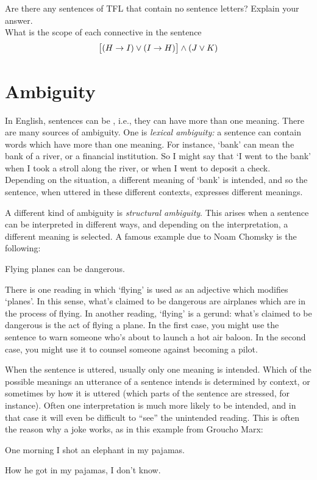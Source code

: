 \problempart
Are there any sentences of TFL that contain no sentence letters? Explain your answer.\\

\problempart
What is the scope of each connective in the sentence
$$\bigl[(H \rightarrow I) \vee (I \rightarrow H)\bigr] \wedge (J \vee K)$$

\chapter{Ambiguity}\label{s:AmbiguityTFL}

In English, sentences can be , i.e., they can have more than one meaning.  There are many sources of ambiguity. One is \emph{lexical ambiguity:} a sentence can contain words which have more than one meaning.  For instance, `bank' can mean the bank of a river, or a financial institution. So I might say that `I went to the bank' when I took a stroll along the river, or when I went to deposit a check.  Depending on the situation, a different meaning of `bank' is intended, and so the sentence, when uttered in these different contexts, expresses different meanings.

A different kind of ambiguity is \emph{structural ambiguity}.  This arises when a sentence can be interpreted in different ways, and depending on the interpretation, a different meaning is selected.  A famous example due to Noam Chomsky is the following:
\begin{compactlist}
	\item[] Flying planes can be dangerous.
\end{compactlist}
There is one reading in which `flying' is used as an adjective which modifies `planes'. In this sense, what's claimed to be dangerous are airplanes which are in the process of flying.  In another reading, `flying' is a gerund: what's claimed to be dangerous is the act of flying a plane.  In the first case, you might use the sentence to warn someone who's about to launch a hot air baloon.  In the second case, you might use it to counsel someone against becoming a pilot.

When the sentence is uttered, usually only one meaning is intended. Which of the possible meanings an utterance of a sentence intends is determined by context, or sometimes by how it is uttered (which parts of the sentence are stressed, for instance). Often one interpretation is much more likely to be intended, and in that case it will even be difficult to ``see'' the unintended reading.  This is often the reason why a joke works, as in this example from Groucho Marx:
\begin{compactlist}
	\item[] One morning I shot an elephant in my pajamas.
	\item[] How he got in my pajamas, I don't know.
\end{compactlist}

